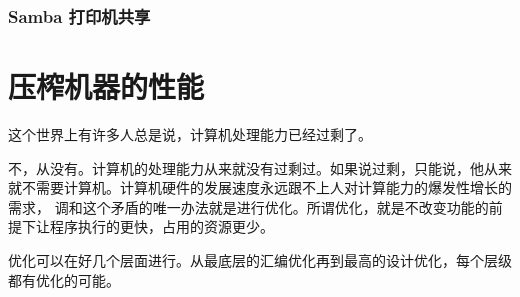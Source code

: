 \documentclass[amstex,twoside]{ctexbook}
\begin{document}
\subsection{ Samba 打印机共享	}


\chapter{压榨机器的性能}

这个世界上有许多人总是说，计算机处理能力已经过剩了。

不，从没有。计算机的处理能力从来就没有过剩过。如果说过剩，只能说，他从来就不需要计算机。计算机硬件的发展速度永远跟不上人对计算能力的爆发性增长的需求，
调和这个矛盾的唯一办法就是进行优化。所谓优化，就是不改变功能的前提下让程序执行的更快，占用的资源更少。

优化可以在好几个层面进行。从最底层的汇编优化再到最高的设计优化，每个层级都有优化的可能。
\end{document}
